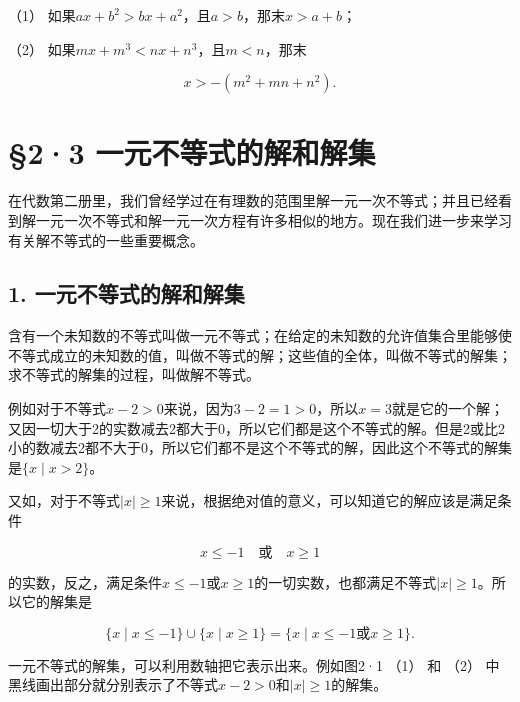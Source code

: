 （1） 如果\(ax+b^2 > bx+a^2\)，且\(a>b\)，那末\(x > a + b\)；

（2） 如果\(mx+m^3 < nx+n^3\)，且\(m < n\)，那末

\[
x > - (m^{2} + m n + n^{2}).
\]

\section{§2·3 一元不等式的解和解集}

在代数第二册里，我们曾经学过在有理数的范围里解一元一次不等式；并且已经看到解一元一次不等式和解一元一次方程有许多相似的地方。现在我们进一步来学习有关解不等式的一些重要概念。

\subsection{1. 一元不等式的解和解集}

含有一个未知数的不等式叫做一元不等式；在给定的未知数的允许值集合里能够使不等式成立的未知数的值，叫做不等式的解；这些值的全体，叫做不等式的解集；求不等式的解集的过程，叫做解不等式。

例如对于不等式\(x - 2 > 0\)来说，因为\(3 - 2 = 1 > 0\)，所以\(x = 3\)就是它的一个解；又因一切大于2的实数减去2都大于0，所以它们都是这个不等式的解。但是2或比2小的数减去2都不大于0，所以它们都不是这个不等式的解，因此这个不等式的解集是\(\{x \mid x > 2\}\)。

又如，对于不等式\(|x| \geqslant 1\)来说，根据绝对值的意义，可以知道它的解应该是满足条件

\[
x \leqslant - 1 \quad \text{或} \quad x \geqslant 1
\]

的实数，反之，满足条件\(x \leqslant -1\)或\(x \geqslant 1\)的一切实数，也都满足不等式\(|x| \geqslant 1\)。所以它的解集是

\[
\{x \mid x \leqslant - 1 \} \cup \{x \mid x \geqslant 1 \} = \{x \mid x \leqslant - 1 \text{或} x \geqslant 1 \}.
\]

一元不等式的解集，可以利用数轴把它表示出来。例如图2·1 （1） 和 （2）
中黑线画出部分就分别表示了不等式\(x - 2 > 0\)和\(|x| \geqslant 1\)的解集。

